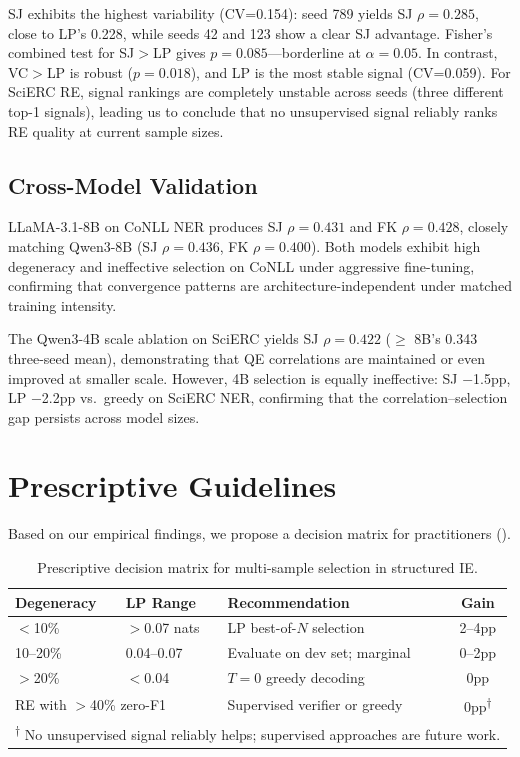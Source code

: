 \documentclass[11pt,a4paper]{article}
\newcommand{\rmark}[1]{\textsuperscript{#1}}
\begin{document}
SJ exhibits the highest variability (CV=0.154): seed 789 yields SJ $\rho{=}0.285$, close to LP's 0.228, while seeds 42 and 123 show a clear SJ advantage.
Fisher's combined test for SJ$>$LP gives $p{=}0.085$---borderline at $\alpha{=}0.05$.
In contrast, VC$>$LP is robust ($p{=}0.018$), and LP is the most stable signal (CV=0.059).
For SciERC RE, signal rankings are completely unstable across seeds (three different top-1 signals), leading us to conclude that no unsupervised signal reliably ranks RE quality at current sample sizes.

\subsection{Cross-Model Validation}

LLaMA-3.1-8B on CoNLL NER produces SJ $\rho{=}0.431$ and FK $\rho{=}0.428$, closely matching Qwen3-8B (SJ $\rho{=}0.436$, FK $\rho{=}0.400$).
Both models exhibit high degeneracy and ineffective selection on CoNLL under aggressive fine-tuning, confirming that convergence patterns are architecture-independent under matched training intensity.

The Qwen3-4B scale ablation on SciERC yields SJ $\rho{=}0.422$ ($\ge$ 8B's 0.343 three-seed mean), demonstrating that QE correlations are maintained or even improved at smaller scale.
However, 4B selection is equally ineffective: SJ $-$1.5pp, LP $-$2.2pp vs.\ greedy on SciERC NER, confirming that the correlation--selection gap persists across model sizes.

\section{Prescriptive Guidelines}

Based on our empirical findings, we propose a decision matrix for practitioners ().

\begin{table}[t]
\centering
\small
\caption{Prescriptive decision matrix for multi-sample selection in structured IE.}
\label{tab:guidelines}
\begin{tabular}{p{2.3cm}p{2cm}p{4.5cm}c}
\toprule
\textbf{Degeneracy} & \textbf{LP Range} & \textbf{Recommendation} & \textbf{Gain} \\
\midrule
$<$10\% & $>$0.07 nats & LP best-of-$N$ selection & 2--4pp \\
10--20\% & 0.04--0.07 & Evaluate on dev set; marginal & 0--2pp \\
$>$20\% & $<$0.04 & $T{=}0$ greedy decoding & 0pp \\
\midrule
\multicolumn{2}{l}{RE with $>$40\% zero-F1} & Supervised verifier or greedy & 0pp\rmark{$\dagger$} \\
\bottomrule
\multicolumn{4}{l}{\scriptsize \rmark{$\dagger$} No unsupervised signal reliably helps; supervised approaches are future work.}
\end{tabular}
\end{table}
\end{document}
